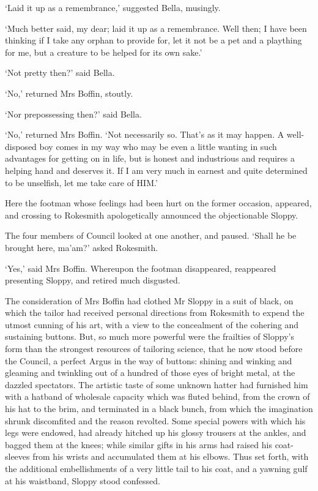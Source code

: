 ‘Laid it up as a remembrance,’ suggested Bella, musingly.

‘Much better said, my dear; laid it up as a remembrance. Well then; I
have been thinking if I take any orphan to provide for, let it not be
a pet and a plaything for me, but a creature to be helped for its own
sake.’

‘Not pretty then?’ said Bella.

‘No,’ returned Mrs Boffin, stoutly.

‘Nor prepossessing then?’ said Bella.

‘No,’ returned Mrs Boffin. ‘Not necessarily so. That’s as it may happen.
A well-disposed boy comes in my way who may be even a little wanting in
such advantages for getting on in life, but is honest and industrious
and requires a helping hand and deserves it. If I am very much in
earnest and quite determined to be unselfish, let me take care of HIM.’

Here the footman whose feelings had been hurt on the former occasion,
appeared, and crossing to Rokesmith apologetically announced the
objectionable Sloppy.

The four members of Council looked at one another, and paused. ‘Shall he
be brought here, ma’am?’ asked Rokesmith.

‘Yes,’ said Mrs Boffin. Whereupon the footman disappeared, reappeared
presenting Sloppy, and retired much disgusted.

The consideration of Mrs Boffin had clothed Mr Sloppy in a suit of
black, on which the tailor had received personal directions from
Rokesmith to expend the utmost cunning of his art, with a view to the
concealment of the cohering and sustaining buttons. But, so much
more powerful were the frailties of Sloppy’s form than the strongest
resources of tailoring science, that he now stood before the Council,
a perfect Argus in the way of buttons: shining and winking and gleaming
and twinkling out of a hundred of those eyes of bright metal, at the
dazzled spectators. The artistic taste of some unknown hatter had
furnished him with a hatband of wholesale capacity which was fluted
behind, from the crown of his hat to the brim, and terminated in a black
bunch, from which the imagination shrunk discomfited and the reason
revolted. Some special powers with which his legs were endowed, had
already hitched up his glossy trousers at the ankles, and bagged them at
the knees; while similar gifts in his arms had raised his coat-sleeves
from his wrists and accumulated them at his elbows. Thus set forth, with
the additional embellishments of a very little tail to his coat, and a
yawning gulf at his waistband, Sloppy stood confessed.

